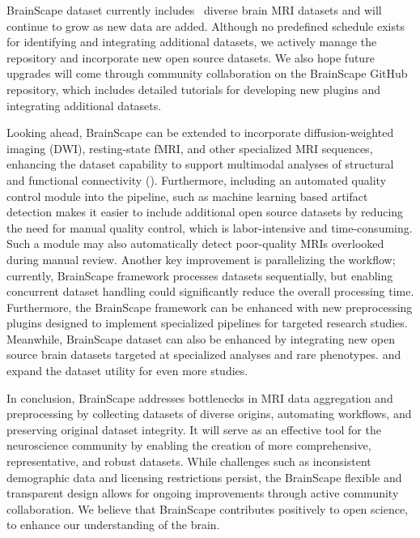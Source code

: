 BrainScape dataset currently includes \NumDatasets\ diverse brain MRI datasets and will continue to grow as new data are added. 
Although no predefined schedule exists for identifying and integrating additional datasets, 
we actively manage the repository and incorporate new open source datasets. 
We also hope future upgrades will come through community collaboration on the BrainScape GitHub repository, 
which includes detailed tutorials for developing new plugins and integrating additional datasets.

Looking ahead, BrainScape can be extended to incorporate diffusion-weighted imaging (DWI), resting-state fMRI, 
and other specialized MRI sequences, enhancing the dataset capability to support multimodal analyses 
of structural and functional connectivity (\cite{van2013wu}). 
Furthermore, including an automated quality control module into the pipeline, such as machine learning based artifact detection 
makes it easier to include additional open source datasets by reducing the need for manual quality control, which is labor-intensive and time-consuming. 
Such a module may also automatically detect poor-quality MRIs overlooked during manual review. 
Another key improvement is parallelizing the workflow; currently, BrainScape framework processes datasets sequentially, 
but enabling concurrent dataset handling could significantly reduce the overall processing time. 
Furthermore, the BrainScape framework can be enhanced with new preprocessing plugins designed to implement specialized pipelines for targeted research studies.
Meanwhile, BrainScape dataset can also be enhanced by integrating new open source brain datasets 
targeted at specialized analyses and rare phenotypes.
and expand the dataset utility for even more studies. 

In conclusion, BrainScape addresses bottlenecks in MRI data aggregation and preprocessing by 
collecting datasets of diverse origins, automating workflows, and preserving original dataset integrity. 
It will serve as an effective tool for the neuroscience community by enabling the creation of more comprehensive, representative, and robust datasets.
While challenges such as inconsistent demographic data and licensing restrictions persist, 
the BrainScape flexible and transparent design allows for ongoing improvements through active community collaboration.
We believe that BrainScape contributes positively to open science, to enhance our understanding of the brain.